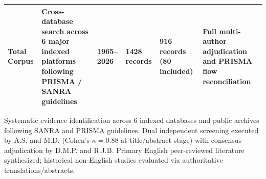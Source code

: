\begin{table}[t]
\begin{tabular*}{\textwidth}{@{\extracolsep\fill}p{2.0cm}p{7.0cm}p{1.6cm}p{1.3cm}p{1.3cm}p{3.0cm}@{}}
\raggedright\scriptsize \textbf{Total Corpus} & \raggedright\scriptsize Cross-database search across 6 major indexed platforms following PRISMA / SANRA guidelines & \raggedright\scriptsize 1965--2026 & \raggedright\scriptsize 1428 records & \raggedright\scriptsize 916 records (80 included) & \raggedright\scriptsize Full multi-author adjudication and PRISMA flow reconciliation \\
\bottomrule
\end{tabular*}
\begin{tablenotes}
\item Systematic evidence identification across 6 indexed databases and public archives following SANRA and PRISMA guidelines. Dual independent screening executed by A.S. and M.D. (Cohen's $\kappa = 0.88$ at title/abstract stage) with consensus adjudication by D.M.P. and R.J.B. Primary English peer-reviewed literature synthesized; historical non-English studies evaluated via authoritative translations/abstracts.
\end{tablenotes}
\end{table}
